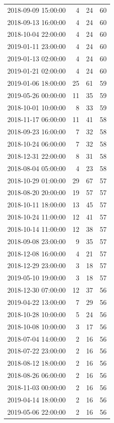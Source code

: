 \begin{tabular}{lrrr}
2018-09-09 15:00:00 & 4 & 24 & 60 \\
2018-09-13 16:00:00 & 4 & 24 & 60 \\
2018-10-04 22:00:00 & 4 & 24 & 60 \\
2019-01-11 23:00:00 & 4 & 24 & 60 \\
2019-01-13 02:00:00 & 4 & 24 & 60 \\
2019-01-21 02:00:00 & 4 & 24 & 60 \\
2019-01-06 18:00:00 & 25 & 61 & 59 \\
2019-05-26 00:00:00 & 11 & 35 & 59 \\
2018-10-01 10:00:00 & 8 & 33 & 59 \\
2018-11-17 06:00:00 & 11 & 41 & 58 \\
2018-09-23 16:00:00 & 7 & 32 & 58 \\
2018-10-24 06:00:00 & 7 & 32 & 58 \\
2018-12-31 22:00:00 & 8 & 31 & 58 \\
2018-08-04 05:00:00 & 4 & 23 & 58 \\
2018-10-29 01:00:00 & 29 & 67 & 57 \\
2018-08-20 20:00:00 & 19 & 57 & 57 \\
2018-10-11 18:00:00 & 13 & 45 & 57 \\
2018-10-24 11:00:00 & 12 & 41 & 57 \\
2018-10-14 11:00:00 & 12 & 38 & 57 \\
2018-09-08 23:00:00 & 9 & 35 & 57 \\
2018-12-08 16:00:00 & 4 & 21 & 57 \\
2018-12-29 23:00:00 & 3 & 18 & 57 \\
2019-05-10 19:00:00 & 3 & 18 & 57 \\
2018-12-30 07:00:00 & 12 & 37 & 56 \\
2019-04-22 13:00:00 & 7 & 29 & 56 \\
2018-10-28 10:00:00 & 5 & 24 & 56 \\
2018-10-08 10:00:00 & 3 & 17 & 56 \\
2018-07-04 14:00:00 & 2 & 16 & 56 \\
2018-07-22 23:00:00 & 2 & 16 & 56 \\
2018-08-12 18:00:00 & 2 & 16 & 56 \\
2018-08-26 06:00:00 & 2 & 16 & 56 \\
2018-11-03 00:00:00 & 2 & 16 & 56 \\
2019-04-14 18:00:00 & 2 & 16 & 56 \\
2019-05-06 22:00:00 & 2 & 16 & 56 \\

\end{tabular}
